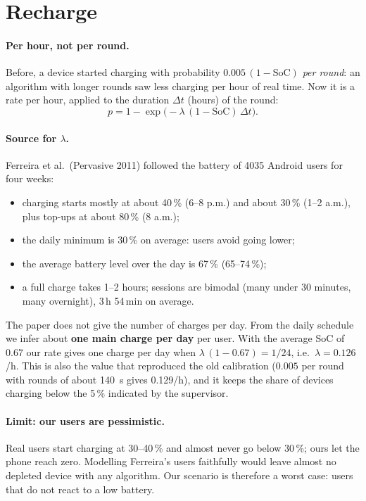 \documentclass[11pt,a4paper]{article}
\begin{document}
\section{Recharge}
\label{sec:recharge}

\paragraph{Per hour, not per round.} Before, a device started charging with
probability $0.005\,(1-\mathrm{SoC})$ \emph{per round}: an algorithm with
longer rounds saw less charging per hour of real time. Now it is a rate per
hour, applied to the duration $\Delta t$ (hours) of the round:
\[
p = 1 - \exp\!\big(-\lambda\,(1-\mathrm{SoC})\,\Delta t\big).
\]

\paragraph{Source for $\lambda$.} Ferreira et al.\ (Pervasive 2011) followed
the battery of 4035 Android users for four weeks:
\begin{itemize}
  \item charging starts mostly at about 40\,\% (6--8 p.m.) and about 30\,\%
        (1--2 a.m.), plus top-ups at about 80\,\% (8 a.m.);
  \item the daily minimum is 30\,\% on average: users avoid going lower;
  \item the average battery level over the day is 67\,\% (65--74\,\%);
  \item a full charge takes 1--2 hours; sessions are bimodal (many under
        30 minutes, many overnight), 3\,h 54\,min on average.
\end{itemize}
The paper does not give the number of charges per day. From the daily
schedule we infer about \textbf{one main charge per day} per user. With the
average SoC of 0.67 our rate gives one charge per day when
$\lambda\,(1-0.67) = 1/24$, i.e.\ $\lambda = 0.126$/h. This is also the value
that reproduced the old calibration ($0.005$ per round with rounds of about
140~s gives 0.129/h), and it keeps the share of devices charging below the
5\,\% indicated by the supervisor.

\paragraph{Limit: our users are pessimistic.} Real users start charging at
30--40\,\% and almost never go below 30\,\%; ours let the phone reach zero.
Modelling Ferreira's users faithfully would leave almost no depleted device
with any algorithm. Our scenario is therefore a worst case: users that do not
react to a low battery.
\end{document}

